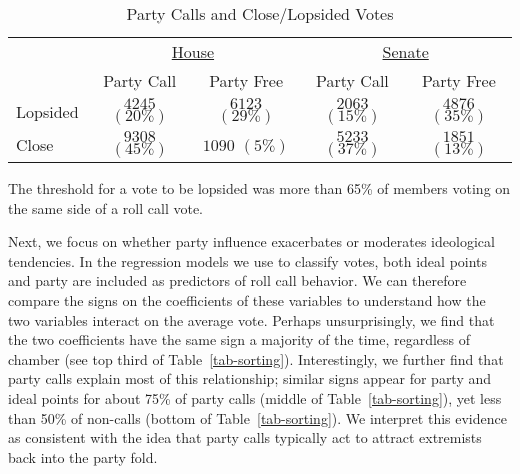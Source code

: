 \documentclass[12pt]{article}
\begin{document}
\begin{table}[!htbp]
\centering
\begin{threeparttable}
\singlespacing
\caption{Party Calls and Close/Lopsided Votes}
\label{tab-close-lop}
\begin{tabular}{l cc|cc}

\hline
&\multicolumn{2}{c}{\underline{House}}&\multicolumn{2}{c}{\underline{Senate}}\\
         & Party Call      & Party Free      & Party Call      & Party Free \\
\hline
Lopsided & $4245$ $(20\%)$ & $6123$ $(29\%)$ & $2063$ $(15\%)$ & $4876$ $(35\%)$ \\
Close    & $9308$ $(45\%)$ & $1090$ $(5\%)$  & $5233$ $(37\%)$ & $1851$ $(13\%)$ \\
\hline
\end{tabular}
\begin{tablenotes}
   \item
   The threshold for a vote to be lopsided was more than 65\% of members voting on the same side of a roll call vote.
 \end{tablenotes}
\end{threeparttable}
\end{table}

Next, we focus on whether party influence exacerbates or moderates ideological tendencies.  In the regression models we use to classify votes, both ideal points and party are included as predictors of roll call behavior.  We can therefore compare the signs on the coefficients of these variables to understand how the two variables interact on the average vote.  Perhaps unsurprisingly, we find that the two coefficients have the same sign a majority of the time, regardless of chamber (see top third of Table~\ref{tab-sorting}).  Interestingly, we further find that party calls explain most of this relationship; similar signs appear for party and ideal points for about 75\% of party calls (middle of Table~\ref{tab-sorting}), yet less than 50\% of non-calls (bottom of Table~\ref{tab-sorting}).  We interpret this evidence as consistent with the idea that party calls typically act to attract extremists back into the party fold.
\end{document}
